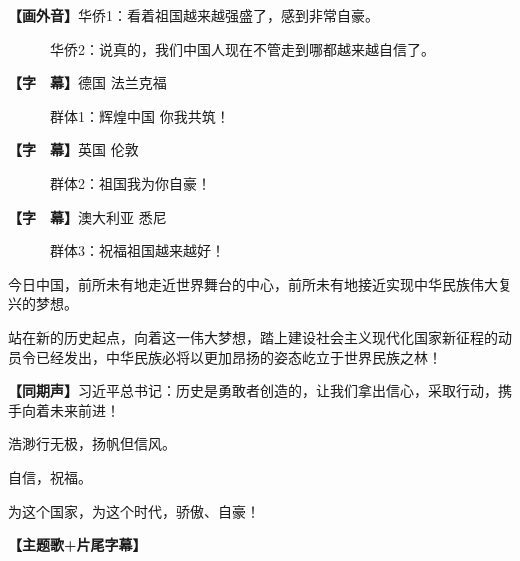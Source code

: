 \documentclass{ctexart}
\newcommand{\zkh}[1]{\textbf{\hspace{-2.7em} 【#1】}}
\begin{document}
\zkh{画外音}华侨1：看着祖国越来越强盛了，感到非常自豪。

　　　华侨2：说真的，我们中国人现在不管走到哪都越来越自信了。

\zkh{字　幕}德国 法兰克福

　　　群体1：辉煌中国 你我共筑！

\zkh{字　幕}英国 伦敦

　　　群体2：祖国我为你自豪！

\zkh{字　幕}澳大利亚 悉尼

　　　群体3：祝福祖国越来越好！

今日中国，前所未有地走近世界舞台的中心，前所未有地接近实现中华民族伟大复兴的梦想。

站在新的历史起点，向着这一伟大梦想，踏上建设社会主义现代化国家新征程的动员令已经发出，中华民族必将以更加昂扬的姿态屹立于世界民族之林！

\zkh{同期声}习近平总书记：历史是勇敢者创造的，让我们拿出信心，采取行动，携手向着未来前进！

浩渺行无极，扬帆但信风。

自信，祝福。

为这个国家，为这个时代，骄傲、自豪！

\zkh{主题歌+片尾字幕}
\end{document}
